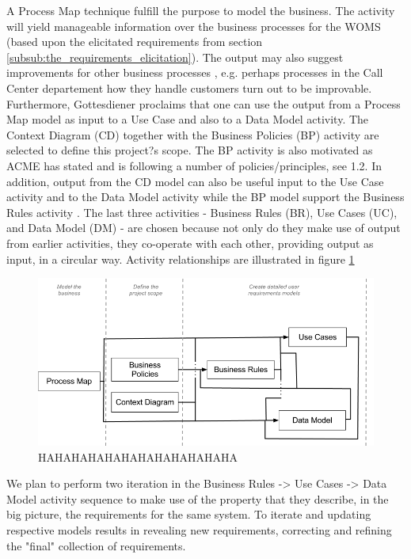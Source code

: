 \documentclass[a4paper]{article}
\begin{document}
A Process Map technique fulfill the purpose to model the business. The activity will yield manageable information over the business processes for the WOMS (based upon the elicitated requirements from section \ref{subsub:the_requirements_elicitation}). The output may also suggest improvements for other business processes \cite{gott122}, e.g. perhaps processes in the Call Center departement how they handle customers turn out to be improvable. Furthermore, Gottesdiener proclaims that one can use the output from a Process Map model as input to a Use Case and also to a Data Model activity\cite{gott126}.
      The Context Diagram (CD) together with the Business Policies (BP) activity are selected to define this project?s scope. The BP activity is also motivated as ACME has stated and is following a number of policies/principles, see 1.2. In addition, output from the CD model can also be useful input to the Use Case activity and to the Data Model activity\cite{gott131} while the BP model support the Business Rules activity \cite{gott143}.
     The last three activities - Business Rules (BR), Use Cases (UC), and Data Model (DM) - are chosen because not only do they make use of output from earlier activities, they co-operate with each other, providing output as input, in a circular way. Activity relationships are illustrated in figure \ref{figure:business}
     
\begin{figure}[!ht]
	\centering
		\includegraphics[width=1\textwidth]{images/model_the_business.png}
	\caption{HAHAHAHAHAHAHAHAHAHAHAHA}
	\label{figure:business}
\end{figure}
     
We plan to perform two iteration in the Business Rules -> Use Cases -> Data Model activity sequence to make use of the property that they describe, in the big picture, the requirements for the same system. To iterate and updating respective models results in revealing new requirements, correcting and refining the "final" collection of requirements.
\end{document}
